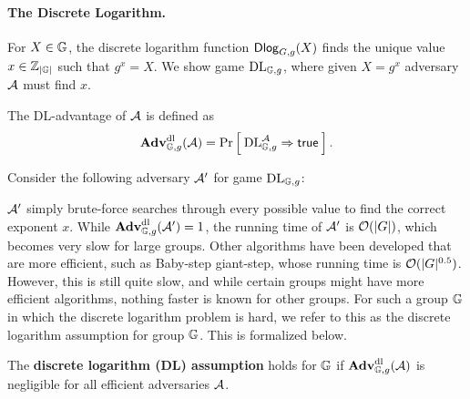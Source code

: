 \paragraph{The Discrete Logarithm.} For $X \in \mathbb{G}$, the discrete logarithm function $\mathsf{Dlog}_{G,g}(X)$ finds the unique value $x \in {{\mathbb Z}}_{|\mathbb{G}|}$ such that $g^x = X$. We show game $\textnormal{DL}_{\mathbb{G}, g}$, where given $X = g^x$ adversary ${\mathcal A}$ must find $x$. 

\begin{center}
\end{center}

The DL-advantage of ${\mathcal A}$ is defined as 
\begin{equation*}
\mathbf{Adv}^{\mathrm{dl}}_{\mathbb{G}, g}({\mathcal A}) = \Pr\left[\: \textnormal{DL}^{\mathcal A}_{\mathbb{G}, g}\Rightarrow\mathsf{true} \:\right].
\end{equation*}

Consider the following adversary ${\mathcal A}'$ for game $\textnormal{DL}_{\mathbb{G}, g}$:

\begin{center}
\end{center}

${\mathcal A}'$ simply brute-force searches through every possible value to find the correct exponent $x$. While $\mathbf{Adv}^{\mathrm{dl}}_{\mathbb{G}, g}({\mathcal A}')=1$, the running time of ${\mathcal A}'$ is ${\cal O}(|G|)$, which becomes very slow for large groups. Other algorithms have been developed that are more efficient, such as Baby-step giant-step, whose running time is ${\cal O}(|G|^{0.5})$. However, this is still quite slow, and while certain groups might have more efficient algorithms, nothing faster is known for other groups. For such a group $\mathbb{G}$ in which the discrete logarithm problem is hard, we refer to this as the discrete logarithm assumption for group $\mathbb{G}$. This is formalized below.

\begin{definition}
	The \textbf{discrete logarithm (DL) assumption} holds for $\mathbb{G}$ if $\mathbf{Adv}^{\mathrm{dl}}_{\mathbb{G}, g}({\mathcal A})$ is negligible for all efficient adversaries ${\mathcal A}$.
\end{definition}

